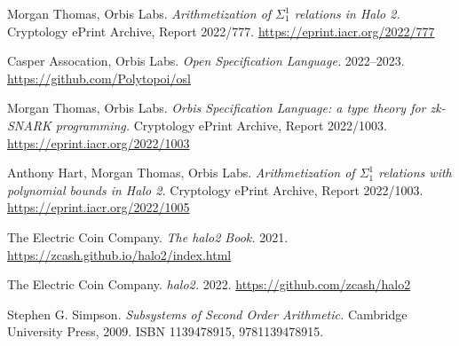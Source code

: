 \documentclass[11pt]{article}
\begin{document}
\clearpage

\begin{thebibliography}{6}
	
	 Morgan Thomas, Orbis Labs. \textit{Arithmetization of $\Sigma^1_1$ relations in Halo 2.} Cryptology ePrint Archive, Report 2022/777. \url{https://eprint.iacr.org/2022/777}

	 Casper Assocation, Orbis Labs. \textit{Open Specification Language.} 2022--2023. \url{https://github.com/Polytopoi/osl}

	 Morgan Thomas, Orbis Labs. \textit{Orbis Specification Language: a type theory for zk-SNARK programming.} Cryptology ePrint Archive, Report 2022/1003. \url{https://eprint.iacr.org/2022/1003}

	 Anthony Hart, Morgan Thomas, Orbis Labs. \textit{Arithmetization of $\Sigma^1_1$ relations with polynomial bounds in Halo 2.} Cryptology ePrint Archive, Report 2022/1003. \url{https://eprint.iacr.org/2022/1005}

	 The Electric Coin Company. \textit{The halo2 Book.} 2021. \url{https://zcash.github.io/halo2/index.html}

	 The Electric Coin Company. \textit{halo2.} 2022. \url{https://github.com/zcash/halo2}

	 Stephen G. Simpson. \textit{Subsystems of Second Order Arithmetic.} Cambridge University Press, 2009. ISBN 1139478915, 9781139478915.


\end{thebibliography}
\end{document}
